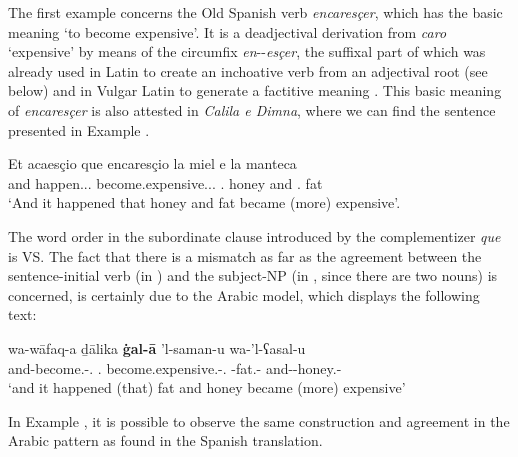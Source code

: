 \documentclass[output=paper]{langscibook}
\begin{document}
The first example concerns the Old Spanish verb \textit{encaresçer}, which has the basic meaning ‘to become expensive’. It is a deadjectival derivation from \textit{caro} ‘expensive’ by means of the circumfix \textit{en}-\ADJ{}-\textit{esçer}, the suffixal part of which was already used in Latin to create an inchoative verb from an adjectival root (see below) and in Vulgar Latin to generate a factitive meaning \citep[§316]{vaananen_introduction_1978}. This basic meaning of \textit{encaresçer} is also attested in \textit{Calila e Dimna}, where we can find the sentence presented in Example .

\begin{exe}
    \ex\label{doehla:ex:4}
    \gll Et acaesçio que encaresçio la miel e la manteca \\
    and happen.\Third\SG.\PST.\PFV{} \COMPL{} become.expensive.\Third\SG.\PST.\PFV{} \Def.\F{} honey and \Def.\F{} fat \\
    \glt ‘And it happened that honey and fat became (more) 	expensive’. \citep[A.VI.9]{dohla_libro_2009}
\end{exe}


The word order in the subordinate clause introduced by the complementizer \textit{que} is VS. The fact that there is a mismatch as far as the agreement between the sentence-initial verb (in \SG{}) and the subject-NP (in \PL{}, since there are two nouns) is concerned, is certainly due to the Arabic model, which displays the following text:

\begin{exe}
    \ex\label{doehla:ex:5}
    \gll wa-wāfaq-a ḏālika \textbf{ġal-ā} 'l-saman-u {wa-'l-ʕasal-u\footnotemark[15]} \\
    and-become.\PFV-\Third\SG.\M{} \DEM.\DIST{} become.expensive.\PFV-\Third\SG.\M{} \Def-fat.\M-\NOM{} and-\Def-honey.\M-\NOM{} \\
    \glt ‘and it happened (that) fat and honey became (more) expensive’ \citep[fo. 139r]{ibn_al-muqaffa_kitab_nodate}
\end{exe}


In Example , it is possible to observe the same construction and agreement in the Arabic pattern as found in the Spanish translation.
\end{document}
